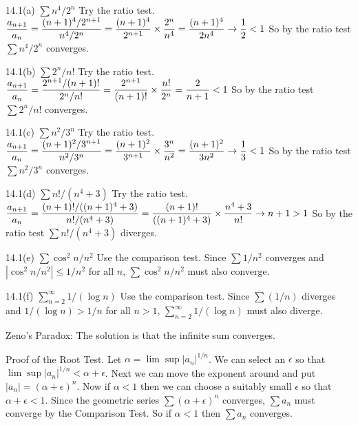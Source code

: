 \parindent=0pt


14.1(a) $\sum n^4/2^n$ Try the ratio test.
\medskip
$\displaystyle{
{a_{n+1}\over a_n}
={(n+1)^4/2^{n+1}\over n^4/2^n}
={(n+1)^4\over2^{n+1}}\times{2^n\over n^4}
={(n+1)^4\over2n^4}\rightarrow{1\over2}<1}$
\medskip
So by the ratio test $\sum n^4/2^n$ converges.

\bigskip

14.1(b) $\sum2^n/n!$ Try the ratio test.
\medskip
$\displaystyle{{a_{n+1}\over a_n}={2^{n+1}/(n+1)!\over 2^n/n!}
={2^{n+1}\over(n+1)!}\times{n!\over2^n}={2\over n+1}<1}$
\medskip
So by the ratio test $\sum2^n/n!$ converges.

\bigskip

14.1(c) $\sum n^2/3^n$ Try the ratio test.
\medskip
$\displaystyle{
{a_{n+1}\over a_n}
={(n+1)^2/3^{n+1}\over n^2/3^n}
={(n+1)^2\over 3^{n+1}}\times{3^n\over n^2}
={(n+1)^2\over3n^2}\rightarrow{1\over3}<1
}$
\medskip
So by the ratio test $\sum n^2/3^n$ converges.

\bigskip

14.1(d) $\sum n!/(n^4+3)$ Try the ratio test.
\medskip
$\displaystyle{
{a_{n+1}\over a_n}
={(n+1)!/((n+1)^4+3)\over n!/(n^4+3)}
={(n+1)!\over((n+1)^4+3)}\times{n^4+3\over n!}
\rightarrow n+1>1
}$
\medskip
So by the ratio test $\sum n!/(n^4+3)$ diverges.

\bigskip

14.1(e) $\sum\cos^2 n/n^2$ Use the comparison test.
Since $\sum1/n^2$ converges and
$|\cos^2 n/n^2|\le1/n^2$ for all $n$, $\sum\cos^2 n/n^2$ must also converge.

\bigskip

14.1(f) $\sum_{n=2}^\infty1/(\log n)$ Use the comparison test.
Since $\sum(1/n)$ diverges and $1/(\log n)>1/n$ for all $n>1$,
$\sum_{n=2}^\infty1/(\log n)$ must also diverge.


Zeno's Paradox: The solution is that the infinite sum converges.

\bigskip

Proof of the Root Test. Let $\alpha=\lim\sup|a_n|^{1/n}$.
We can select an $\epsilon$ so that $\lim\sup|a_n|^{1/n}<\alpha+\epsilon$.
Next we can move the exponent around and put $|a_n|=(\alpha+\epsilon)^n$.
Now if $\alpha<1$ then we can choose a suitably small $\epsilon$ so that
$\alpha+\epsilon<1$. Since the geometric series $\sum(\alpha+\epsilon)^n$
converges, $\sum a_n$ must converge by the Comparison Test.
So if $\alpha<1$ then $\sum a_n$ converges.

